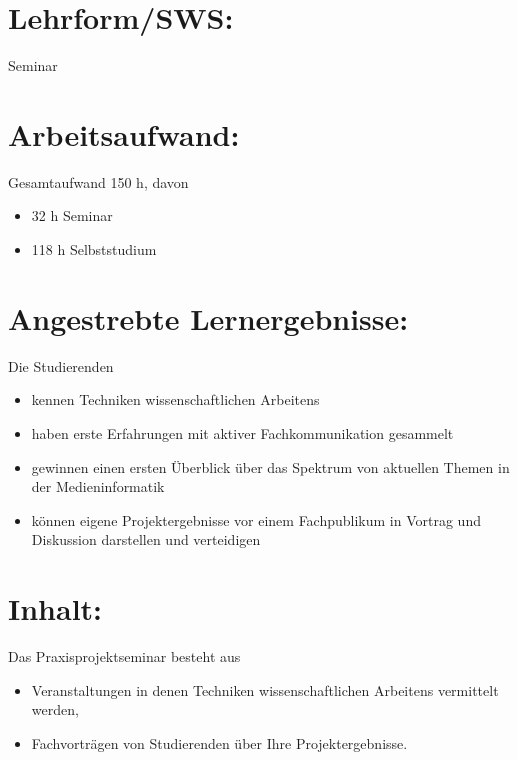 \section*{Lehrform/SWS:}\label{lehrformsws-19}

Seminar

\section*{Arbeitsaufwand:}\label{arbeitsaufwand-18}

Gesamtaufwand 150 h, davon

\begin{itemize}
\item
  32 h Seminar
\item
  118 h Selbststudium
\end{itemize}

\section*{Angestrebte
Lernergebnisse:}\label{angestrebte-lernergebnisse-19}

Die Studierenden

\begin{itemize}
\item
  kennen Techniken wissenschaftlichen Arbeitens
\item
  haben erste Erfahrungen mit aktiver Fachkommunikation gesammelt
\item
  gewinnen einen ersten Überblick über das Spektrum von aktuellen Themen
  in der Medieninformatik
\item
  können eigene Projektergebnisse vor einem Fachpublikum in Vortrag und
  Diskussion darstellen und verteidigen
\end{itemize}

\section*{Inhalt:}\label{inhalt-19}

Das Praxisprojektseminar besteht aus

\begin{itemize}
\item
  Veranstaltungen in denen Techniken wissenschaftlichen Arbeitens
  vermittelt werden,
\item
  Fachvorträgen von Studierenden über Ihre Projektergebnisse.
\end{itemize}

